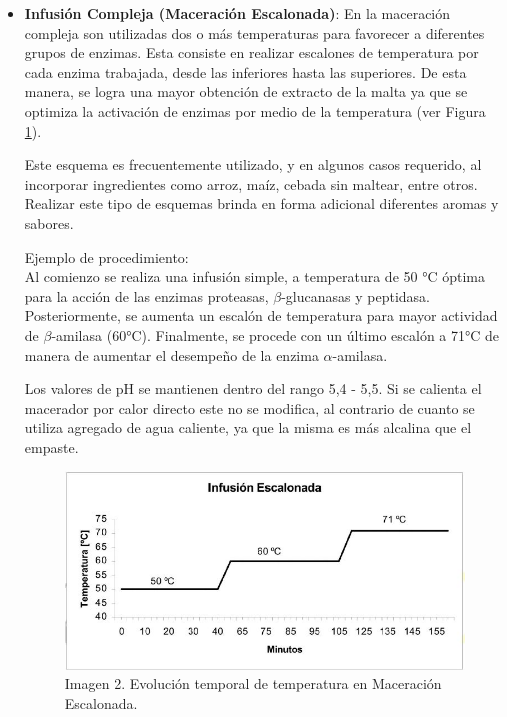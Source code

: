 \begin{itemize}
                    \item \textbf{Infusión Compleja (Maceración Escalonada)}: En la maceración compleja son utilizadas dos o más temperaturas para favorecer a diferentes grupos de enzimas. Esta consiste en realizar escalones de temperatura por cada enzima trabajada, desde las inferiores hasta las superiores. De esta manera, se logra una mayor obtención de extracto de la malta ya que se optimiza la activación de enzimas por medio de la temperatura (ver Figura \ref{MaceracionEscalonada}).
                    
                    \par Este esquema es frecuentemente utilizado, y en algunos casos requerido, al incorporar ingredientes como arroz, maíz, cebada sin maltear, entre otros. Realizar este tipo de esquemas brinda en forma adicional diferentes aromas y sabores.
                    
                    \par Ejemplo de procedimiento: \\ Al comienzo se realiza una infusión simple, a temperatura de 50 °C óptima para la acción de las enzimas proteasas, $\beta$-glucanasas y peptidasa. Posteriormente, se aumenta un escalón de temperatura para mayor actividad de $\beta$-amilasa (60°C). Finalmente, se procede con un último escalón a 71°C de manera de aumentar el desempeño de la enzima $\alpha$-amilasa.
                    
                    \par Los valores de pH se mantienen dentro del rango 5,4 - 5,5. Si se calienta el macerador por calor directo este no se modifica, al contrario de cuanto se utiliza agregado de agua caliente, ya que la misma es más alcalina que el empaste.
                    
                    \begin{figure} [H]		                                                            \centerline{\includegraphics[scale=0.7]{maceracion_escalonada.jpg}}
                        \caption{Imagen 2. Evolución temporal de temperatura en Maceración Escalonada. \cite{Ceresvis}}
                        \label{MaceracionEscalonada}
                    \end{figure}
                    
                \end{itemize}
                
